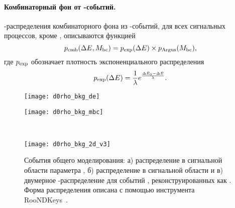 \paragraph{\boldmath Комбинаторный фон от \bbbar-событий.}

\de-\mbc распределения комбинаторного фона из \bbbar-событий, для всех сигнальных процессов, кроме \bdstpi, описываются функцией
\begin{equation}\label{eq:de-mbc-BB}
 p{}_{\mathrm{cmb}}(\Delta E,M_{\mathrm{bc}}) = p_{\mathrm{exp}}(\Delta E)\times p_{\mathrm{Argus}}(M_{\mathrm{bc}}),
\end{equation}
где $p_{\mathrm{exp}}$ обозначает плотность экспоненциального распределения
\begin{equation}\label{eq:exp}
  p_{\mathrm{exp}}(\Delta E) = \frac{1}{\lambda}e^{\frac{\Delta E_0-\Delta E}{\lambda}}.
\end{equation}

\begin{figure}[htb]
\centering
\begin{minipage}[b]{0.45\textwidth}
  \centering
  \texttt{[image: d0rho\_bkg\_de]}
  \subcaption{}
 \end{minipage}
 \begin{minipage}[b]{0.45\textwidth}
  \centering
  \texttt{[image: d0rho\_bkg\_mbc]}
  \subcaption{}
 \end{minipage}
 \\
 \begin{minipage}[b]{0.45\textwidth}
  \centering
  \texttt{[image: d0rho\_bkg\_2d\_v3]}
  \subcaption{}
 \end{minipage}
  \caption{События общего моделирования: а) распределение \de в сигнальной области параметра \mbc, б) распределение \mbc в сигнальной области \de и в) двумерное \de-\mbc распределение для событий \bpdrho, реконструированных как \bdstpi.  Форма распределения описана с помощью инструмента \textrm{RooNDKeys}~\cite{roofit}.}
\label{fig:d0rho}
\end{figure}

